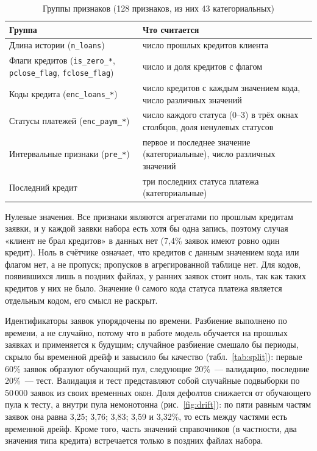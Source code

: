 \documentclass{misisarticle}
\begin{document}
\begin{table}[t]
\caption{Группы признаков (128 признаков, из них 43 категориальных)}
\label{tab:groups}
\centering
\small
\begin{tabular}{p{3.6cm}p{4.3cm}}
\toprule
Группа & Что считается \\
\midrule
Длина истории (\texttt{n\_loans}) & число прошлых кредитов клиента \\
Флаги кредитов (\texttt{is\_zero\_*}, \texttt{pclose\_flag}, \texttt{fclose\_flag}) & число и доля кредитов с флагом \\
Коды кредита (\texttt{enc\_loans\_*}) & число кредитов с каждым значением кода, число различных значений \\
Статусы платежей (\texttt{enc\_paym\_*}) & число каждого статуса (0--3) в трёх окнах столбцов, доля ненулевых статусов \\
Интервальные признаки (\texttt{pre\_*}) & первое и последнее значение (категориальные), число различных значений \\
Последний кредит & три последних статуса платежа (категориальные) \\
\bottomrule
\end{tabular}
\end{table}

Нулевые значения. Все признаки являются агрегатами по прошлым кредитам заявки, и у каждой заявки набора есть хотя бы одна запись, поэтому случая «клиент не брал кредитов» в данных нет (7,4\% заявок имеют ровно один кредит). Ноль в счётчике означает, что кредитов с данным значением кода или флагом нет, а не пропуск; пропусков в агрегированной таблице нет. Для кодов, появившихся лишь в поздних файлах, у ранних заявок стоит ноль, так как таких кредитов у них не было. Значение $0$ самого кода статуса платежа является отдельным кодом, его смысл не раскрыт.

Идентификаторы заявок упорядочены по времени. Разбиение выполнено по времени, а не случайно, потому что в работе модель обучается на прошлых заявках и применяется к будущим; случайное разбиение смешало бы периоды, скрыло бы временной дрейф и завысило бы качество (табл.~\ref{tab:split}): первые 60\% заявок образуют обучающий пул, следующие 20\%~--- валидацию, последние 20\%~--- тест. Валидация и тест представляют собой случайные подвыборки по 50\,000 заявок из своих временных окон. Доля дефолтов снижается от обучающего пула к тесту, а внутри пула немонотонна (рис.~\ref{fig:drift}): по пяти равным частям заявок она равна 3,25; 3,76; 3,83; 3,59 и 3,32\%, то есть между частями есть временной дрейф. Кроме того, часть значений справочников (в частности, два значения типа кредита) встречается только в поздних файлах набора.
\end{document}
